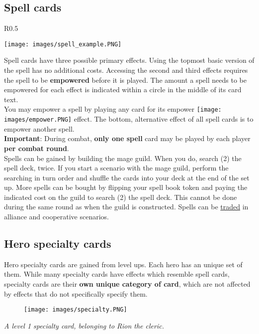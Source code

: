 \documentclass[12pt]{article}
\begin{document}
\clearpage

\subsection*{\hypertarget{spells}{Spell cards}}
\begin{wrapfigure}{R}{0.5\textwidth}
    \begin{center}
    \texttt{[image: images/spell\_example.PNG]}
    \end{center}
\end{wrapfigure}
Spell cards have three possible primary effects. Using the topmost basic version of the spell has no additional costs. Accessing the second and third effects requires the spell to be \textbf{empowered} before it is played. The amount a spell needs to be empowered for each effect is indicated within a circle in the middle of its card text.\\[6pt]
You may empower a spell by playing any card for its empower \texttt{[image: images/empower.PNG]} effect. The bottom, alternative effect of all spell cards is to empower another spell.\\[6pt]
\textbf{Important}: During combat, \textbf{only one spell} card may be played by each player \textbf{per combat round}.\\[6pt]
Spells can be gained by building the mage guild. When you do, search (2) the spell deck, twice. If you start a scenario with the mage guild, perform the searching in turn order and shuffle the cards into your deck at the end of the set up. More spells can be bought by flipping your spell book token and paying the indicated cost on the guild to search (2) the spell deck. This cannot be done during the same round as when the guild is constructed. Spells can be \hyperlink{Trading}{traded} in alliance and cooperative scenarios.

\subsection*{\hypertarget{Specialty}{Hero specialty cards}}
Hero specialty cards are gained from level ups. Each hero has an unique set of them. While many specialty cards have effects which resemble spell cards, specialty cards are their \textbf{own unique category of card}, which are not affected by effects that do not specifically specify them.
\\[6pt]

\begin{figure}[h]
\centering
\texttt{[image: images/specialty.PNG]}
\end{figure}
\begin{center}
\textit{A level 1 specialty card, belonging to Rion the cleric.}
\end{center}
\end{document}
